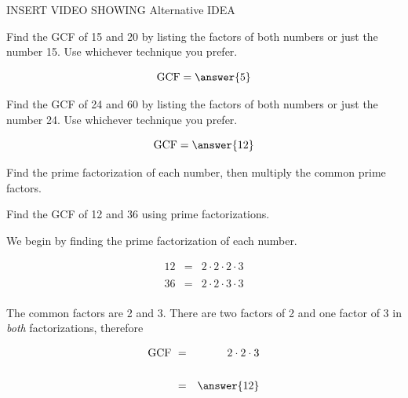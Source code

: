 \documentclass{ximera}[font=12pt]  %
\begin{document}
INSERT VIDEO SHOWING Alternative IDEA



\begin{problem}
Find the GCF of 15 and 20 by listing the factors of both numbers or just the number 15.  Use whichever technique you prefer.

\[ \textrm{GCF} = \answer{5} \]

\end{problem}


\begin{problem}
Find the GCF of 24 and 60 by listing the factors of both numbers or just the number 24.  Use whichever technique you prefer.

\[ \textrm{GCF} = \answer{12} \]

\end{problem}


\begin{procedure}
    
    Find the prime factorization of each number, then multiply the common prime factors.  
    
\end{procedure}

\begin{example}

Find the GCF of 12 and 36 using prime factorizations. 

\begin{explanation}

We begin by finding the prime factorization of each number.

\begin{eqnarray*}
12 &=& 2 \cdot 2 \cdot 2 \cdot 3 \\
   & & \\
36 &=& 2 \cdot 2 \cdot 3 \cdot 3 \\
\end{eqnarray*}

The common factors are 2 and 3.  There are two factors of 2 and one factor of 3 in \textit{both} factorizations, therefore

\begin{eqnarray*}
\textrm{GCF} \  &=& 2 \cdot 2 \cdot 3 \\
   & & \\
   &=& \answer{12} \\
\end{eqnarray*}


\end{explanation}
\end{example}
\end{document}
